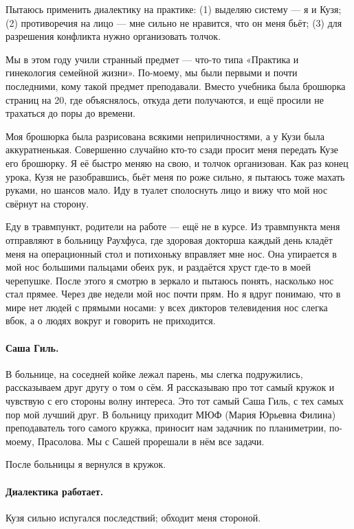 \documentclass{book}
\begin{document}
Пытаюсь применить диалектику на практике:
(1) выделяю систему --- я и Кузя;
(2) противоречия на лицо --- мне сильно не нравится, что он меня бьёт;
(3) для разрешения конфликта нужно организовать толчок.

Мы в этом году учили странный предмет --- что-то типа «Практика и гинекология семейной жизни».
По-моему, мы были первыми и почти последними, кому такой предмет преподавали.
Вместо учебника была брошюрка страниц на 20, где объяснялось, откуда дети получаются, и ещё просили не трахаться до поры до времени.

Моя брошюрка была разрисована всякими неприличностями, а у Кузи была аккуратненькая.
Совершенно случайно кто-то сзади просит меня передать Кузе его брошюрку.
Я её быстро меняю на свою, и толчок организован.
Как раз конец урока, Кузя не разобравшись, бьёт меня по роже сильно,
я пытаюсь тоже махать руками, но шансов мало.
Иду в туалет сполоснуть лицо и вижу что мой нос свёрнут на сторону.

Еду в травмпункт, родители на работе --- ещё не в курсе.
Из травмпункта меня отправляют в больницу Раухфуса,
где здоровая докторша каждый день кладёт меня на операционный стол
и потихоньку вправляет мне нос.
Она упирается в мой нос большими пальцами обеих рук, и раздаётся хруст где-то в моей черепушке.
После этого я смотрю в зеркало и пытаюсь понять, насколько нос стал прямее.
Через две недели мой нос почти прям.
Но я вдруг понимаю, что в мире нет людей с прямыми носами:
у всех дикторов телевидения нос слегка вбок, а о людях вокруг и говорить не приходится.

\paragraph{Саша Гиль.}
В больнице, на соседней койке лежал парень,
мы слегка подружились, рассказываем друг другу о том о сём.
Я рассказываю про тот самый кружок и
чувствую с его стороны волну интереса.
Это тот самый Саша Гиль, с тех самых пор мой лучший друг.
В больницу приходит МЮФ (Мария Юрьевна Филина) 
преподаватель того самого кружка,
приносит нам задачник по планиметрии, по-моему, Прасолова.
Мы с Сашей прорешали в нём все задачи.

После больницы я вернулся в кружок.

\paragraph{Диалектика работает.}
Кузя сильно испугался последствий; обходит меня стороной.
\end{document}
